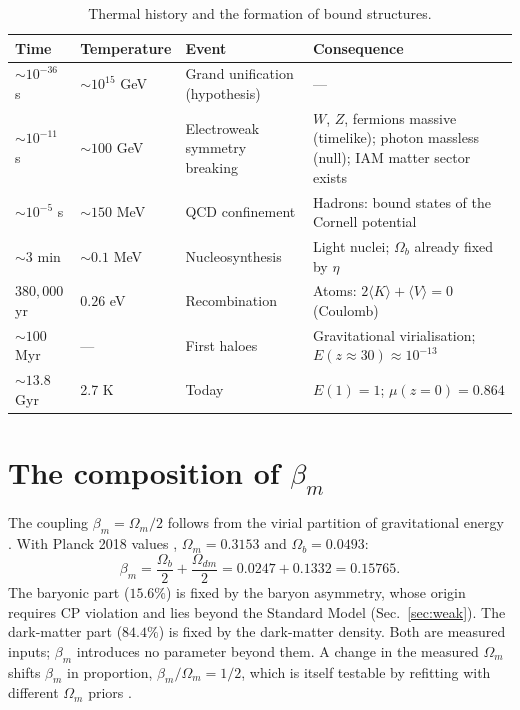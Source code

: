 \documentclass[12pt,a4paper]{article}
\begin{document}
\begin{table}[!htbp]
\centering
\caption{Thermal history and the formation of bound structures.}
\label{tab:sequence}
\begin{tabular}{p{2.2cm} p{2.0cm} p{3.4cm} p{5.6cm}}
\toprule
Time & Temperature & Event & Consequence \\
\midrule
$\sim10^{-36}$ s & $\sim10^{15}$ GeV & Grand unification (hypothesis) & --- \\
$\sim10^{-11}$ s & $\sim100$ GeV & Electroweak symmetry breaking & $W$, $Z$, fermions massive (timelike); photon massless (null); IAM matter sector exists \\
$\sim10^{-5}$ s & $\sim150$ MeV & QCD confinement & Hadrons: bound states of the Cornell potential \\
$\sim3$ min & $\sim0.1$ MeV & Nucleosynthesis & Light nuclei; $\Omega_b$ already fixed by $\eta$ \\
$380{,}000$ yr & $0.26$ eV & Recombination & Atoms: $2\langle K\rangle+\langle V\rangle=0$ (Coulomb) \\
$\sim100$ Myr & --- & First haloes & Gravitational virialisation; $E(z\approx30)\approx10^{-13}$ \\
$\sim13.8$ Gyr & 2.7 K & Today & $E(1)=1$; $\mu(z=0)=0.864$ \\
\bottomrule
\end{tabular}
\end{table}

\section{The composition of $\beta_m$}
\label{sec:beta}

The coupling $\beta_m=\Omega_m/2$ follows from the virial partition of gravitational
energy \citep{mahaffey2026,mahaffey2026_thermo_virial}. With Planck 2018 values
\citep{planck2020}, $\Omega_m=0.3153$ and $\Omega_b=0.0493$:
\begin{equation}
  \beta_m = \frac{\Omega_b}{2} + \frac{\Omega_{dm}}{2}
          = 0.0247 + 0.1332 = 0.15765 .
  \label{eq:beta}
\end{equation}
The baryonic part ($15.6\%$) is fixed by the baryon asymmetry, whose origin
requires CP violation and lies beyond the Standard Model (Sec.~\ref{sec:weak}).
The dark-matter part ($84.4\%$) is fixed by the dark-matter density. Both are
measured inputs; $\beta_m$ introduces no parameter beyond them. A change in the
measured $\Omega_m$ shifts $\beta_m$ in proportion, $\beta_m/\Omega_m=1/2$, which is
itself testable by refitting with different $\Omega_m$ priors \citep{mahaffey2026}.
\end{document}
